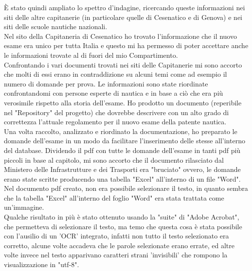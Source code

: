 È stato quindi ampliato lo spettro d'indagine, ricercando queste informazioni nei siti delle altre capitanerie (in particolare quelle di Cesenatico e di Genova) e nei siti delle scuole nautiche nazionali.\\
Nel sito della Capitaneria di Cesenatico ho trovato l'informazione che il nuovo esame era unico per tutta Italia e questo mi ha permesso di poter accettare anche le informazioni trovate al di fuori del mio Compartimento.\\
Confrontando i vari documenti trovati nei siti delle Capitanerie mi sono accorto che molti di essi erano in contraddizione su alcuni temi come ad esempio il numero di domande per prova. Le informazioni sono state riordinate confrontandomi con persone esperte di nautica e in base a ciò che era più verosimile rispetto alla storia dell'esame. Ho prodotto un documento (reperibile nel "Repository" del progetto) che dovrebbe descrivere con un alto grado di correttezza l'attuale regolamento per il nuovo esame della patente nautica.\\
Una volta raccolto, analizzato e riordinato la documentazione, ho preparato le domande dell'esame in un modo da facilitare l'inserimento delle stesse all'interno del database. Dividendo il pdf con tutte le domande dell'esame in tanti pdf più piccoli in base al capitolo, mi sono accorto che il documento rilasciato dal Ministero delle Infrastrutture e dei Trasporti era "bruciato" ovvero, le domande erano state scritte producendo una tabella "Excel" all'interno di un file "Word". Nel documento pdf creato, non era possibile selezionare il testo, in quanto sembra che la tabella "Excel" all'interno del foglio "Word" era stata trattata come un'immagine.\\
Qualche risultato in più è stato ottenuto usando la "suite" di "Adobe Acrobat", che permetteva di selezionare il testo, ma temo che questa cosa è stata possibile con l'ausilio di un 'OCR' integrato, infatti non tutto il testo selezionato era corretto, alcune volte accadeva che le parole selezionate erano errate, ed altre volte invece nel testo apparivano caratteri strani 'invisibili' che rompono la visualizzazione in "utf-8". 

